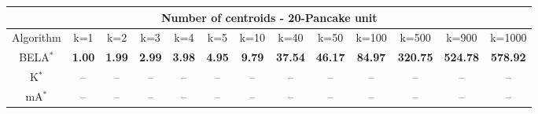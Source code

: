 \begin{tabular}{c|cccccccccccc}\toprule
\multicolumn{13}{c}{Number of centroids - 20-Pancake unit}\\ \midrule
Algorithm & k=1 & k=2 & k=3 & k=4 & k=5 & k=10 & k=40 & k=50 & k=100 & k=500 & k=900 & k=1000 \\ \midrule
BELA$^*$ & \textbf{1.00} & \textbf{1.99} & \textbf{2.99} & \textbf{3.98} & \textbf{4.95} & \textbf{9.79} & \textbf{37.54} & \textbf{46.17} & \textbf{84.97} & \textbf{320.75} & \textbf{524.78} & \textbf{578.92} \\
K$^*$ & -- & -- & -- & -- & -- & -- & -- & -- & -- & -- & -- & -- \\
mA$^*$ & -- & -- & -- & -- & -- & -- & -- & -- & -- & -- & -- & -- \\ \bottomrule 
\end{tabular}

